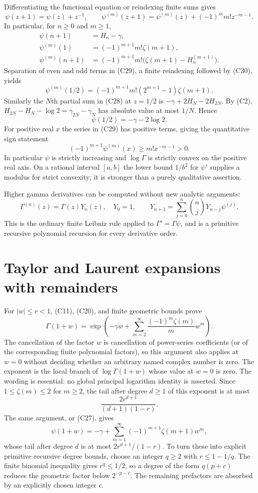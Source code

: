 Differentiating the functional equation or reindexing finite sums gives
\[
 \psi(z+1)=\psi(z)+z^{-1},\qquad
 \psi^{(m)}(z+1)=\psi^{(m)}(z)+(-1)^m m!z^{-m-1}.
 \tag{C31}
\]
In particular, for $n\geq0$ and $m\geq1$,
\[
 \begin{aligned}
 \psi(n+1)&=H_n-\gamma,\\
 \psi^{(m)}(1)&=(-1)^{m+1}m!\zeta(m+1),\\
 \psi^{(m)}(n+1)&=(-1)^{m+1}m!
       \bigl(\zeta(m+1)-H_n^{(m+1)}\bigr).
 \end{aligned}
 \tag{C32}
\]
Separation of even and odd terms in (C29), a finite reindexing followed
by (C30), yields
\[
 \psi^{(m)}(1/2)=(-1)^{m+1}m!(2^{m+1}-1)\zeta(m+1).
 \tag{C33}
\]
Similarly the $N$th partial sum in (C28) at $z=1/2$ is
$-\gamma+2H_N-2H_{2N}$.  By (C2),
$H_{2N}-H_N-\log2=\gamma_{2N}-\gamma_N$ has absolute value at most
$1/N$.  Hence
\[
 \psi(1/2)=-\gamma-2\log2.
 \tag{C34}
\]
For positive real $x$ the series in (C29) has positive terms, giving
the quantitative sign statement
\[
 (-1)^{m+1}\psi^{(m)}(x)\geq m!x^{-m-1}>0.
 \tag{C35}
\]
In particular $\psi$ is strictly increasing and $\log\Gamma$ is
strictly convex on the positive real axis.  On a rational interval
$[a,b]$ the lower bound $1/b^2$ for $\psi'$ supplies a modulus for
strict convexity; it is stronger than a purely qualitative assertion.

Higher gamma derivatives can be computed without new analytic arguments:
\[
 \Gamma^{(n)}(z)=\Gamma(z)Y_n(z),\quad Y_0=1,\qquad
 Y_{n+1}=\sum_{j=0}^n\binom nj Y_{n-j}\psi^{(j)}.
 \tag{C36}
\]
This is the ordinary finite Leibniz rule applied to
$\Gamma'=\Gamma\psi$, and is a primitive recursive polynomial
recursion for every derivative order.

\section{Taylor and Laurent expansions with remainders}

For $|w|\leq r<1$, (C11), (C20), and finite geometric bounds prove
\[
 \Gamma(1+w)=\exp\!\left(
 -\gamma w+\sum_{m=2}^{\infty}
                    \frac{(-1)^m\zeta(m)}m w^m\right).
 \tag{C37}
\]
The cancellation of the factor $w$ is cancellation of power-series
coefficients (or of the corresponding finite polynomial factors),
so this argument also applies at $w=0$ without deciding whether an
arbitrary named complex number is zero.
The exponent is the local branch of $\log\Gamma(1+w)$ whose value at
$w=0$ is zero.  The wording is essential: no global principal logarithm
identity is asserted.  Since $1\leq\zeta(m)\leq2$ for $m\geq2$,
the tail after degree $d\geq1$ of this exponent is at most
\[
 \frac{2r^{d+1}}{(d+1)(1-r)}.
 \tag{C38}
\]
The same argument, or (C27), gives
\[
 \psi(1+w)=-\gamma+
       \sum_{m=1}^{\infty}(-1)^{m+1}\zeta(m+1)w^m,
 \tag{C39}
\]
whose tail after degree $d$ is at most $2r^{d+1}/(1-r)$.
To turn these into explicit primitive recursive degree bounds, choose
an integer $q\geq2$ with $r\leq1-1/q$.  The finite binomial inequality
gives $r^q\leq1/2$, so a degree of the form $q(p+c)$ reduces the
geometric factor below $2^{-p-c}$.  The remaining prefactors are
absorbed by an explicitly chosen integer $c$.

